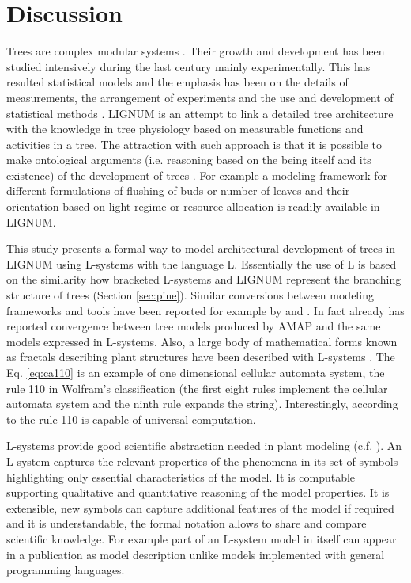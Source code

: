 \section{Discussion}

Trees are complex modular systems \citep{thomas:00}.  Their growth and
development  has  been studied  intensively  during  the last  century
mainly experimentally.   This has resulted statistical  models and the
emphasis has been  on the details of measurements,  the arrangement of
experiments  and  the  use  and  development  of  statistical  methods
\citep{hari:99}.   LIGNUM  is  an  attempt  to link  a  detailed  tree
architecture with the knowledge in tree physiology based on measurable
functions and activities in a  tree. The attraction with such approach
is that it  is possible to make ontological  arguments (i.e. reasoning
based on  the being  itself and its  existence) of the  development of
trees  \citep{perttunen:01}.   For example  a  modeling framework  for
different formulations  of flushing  of buds or  number of  leaves and
their  orientation based  on light  regime or  resource  allocation is
readily available in LIGNUM.

This study presents a formal way to model architectural development of
trees in LIGNUM using L-systems  with the language L.  Essentially the
use of L is based on the similarity how bracketed L-systems and LIGNUM
represent the  branching structure of  trees (Section \ref{sec:pine}).
Similar conversions  between modeling  frameworks and tools  have been
reported for example  by \citet{ferraro:02}and \citet{dzierzon:03}. In
fact already \citet{kurth:em94}  has reported convergence between tree
models produced  by AMAP and  the same models expressed  in L-systems.
Also, a large body of  mathematical forms known as fractals describing
plant structures have  been described with L-systems \citep{kurth:99}.
The  Eq.  \ref{eq:ca110}  is an  example of  one  dimensional cellular
automata  system,   the  rule  110   in  Wolfram's  \citep{wolfram:02}
classification (the first eight  rules implement the cellular automata
system  and  the  ninth  rule  expands  the  string).   Interestingly,
according to  \citet{wolfram:02} the rule 110 is  capable of universal
computation.

L-systems provide good scientific abstraction needed in plant modeling
(c.f.    \citet{regev:02}).   An   L-system   captures  the   relevant
properties of  the phenomena in  its set of symbols  highlighting only
essential characteristics  of the model.  It  is computable supporting
qualitative and quantitative reasoning of the model properties.  It is
extensible, new  symbols can capture additional features  of the model
if required  and it is  understandable, the formal notation  allows to
share  and  compare scientific  knowledge.   For  example  part of  an
L-system  model  in  itself  can  appear in  a  publication  as  model
description  unlike   models  implemented  with   general  programming
languages.

